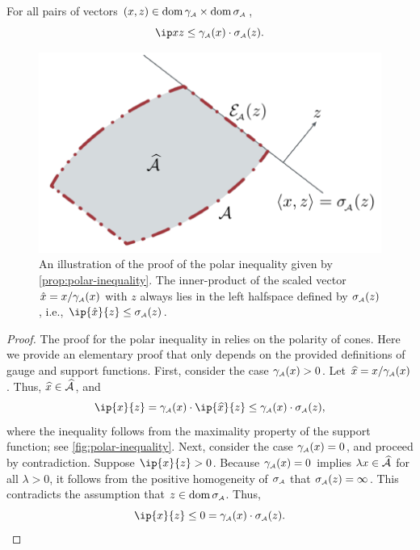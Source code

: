 \begin{proposition} \label{prop:polar-inequality}
    For all pairs of vectors $(x,z)\in\operatorname{dom}\gamma_{\scriptscriptstyle\mathcal{A}}\times\operatorname{dom}\sigma_{\scriptscriptstyle\mathcal{A}}$,
    \begin{equation}
      \label{eq:polar-inequality}
      \ip x z \le \gauge\As(x)\cdot\sigma\As(z).
    \end{equation}
\end{proposition}

\begin{figure}[t] 
    \centering
    \includegraphics[page=10]{./figures/illustrations.pdf}
    \caption{%
    An illustration of the proof of the polar
    inequality given by \autoref{prop:polar-inequality}. The inner-product of the scaled vector $\hat x = x/\gamma_{\scriptscriptstyle\mathcal{A}}(x)$ with $z$ always lies in the left halfspace defined by
    $\sigma_{\scriptscriptstyle\mathcal{A}}(z)$, i.e., $\ip{\hat x}{z}\leq\sigma\As(z)$.
    }
    \label{fig:polar-inequality}
\end{figure}

\begin{proof}
    The proof for the polar inequality in
    \cite[Section~15]{rockafellar1970convex} relies on the polarity of cones.
    Here we provide an elementary proof that only depends on the provided
    definitions of gauge and support functions. First, consider the case
    $\gamma_{\scriptscriptstyle\mathcal{A}}(x) > 0$. Let $\xhat=x/\gauge\As(x)$. Thus, $\xhat\in\convA$, and
    \[
      \ip{x}{z} = \gauge\As(x)\cdot\ip{\xhat}{z} \leq \gauge\As(x)\cdot\sigma\As(z),
    \]
    where the inequality follows from the maximality property of the support
  function; see \autoref{fig:polar-inequality}. Next, consider the case $\gamma_{\scriptscriptstyle\mathcal{A}}(x)
  = 0$, and proceed by contradiction. Suppose $\ip{x}{z} > 0$. Because
  $\gamma_{\scriptscriptstyle\mathcal{A}}(x) = 0$ implies $\lambda x \in \widehat{\mathcal{A}}$ for all $\lambda > 0$, it
  follows from the positive homogeneity of $\sigma_{\scriptscriptstyle\mathcal{A}}$ that $\sigma_{\scriptscriptstyle\mathcal{A}}(z) =
  \infty$. This contradicts the assumption that $z \in \operatorname{dom}\sigma_{\scriptscriptstyle\mathcal{A}}$. Thus, 
  \[
     \ip{x}{z} \leq 0 = \gauge\As(x)\cdot\sigma\As(z).
  \]
\end{proof}

